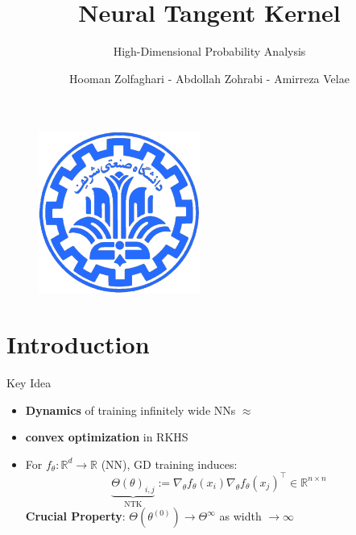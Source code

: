 \documentclass[serif, aspectratio=169]{beamer}
\author{Hooman Zolfaghari - Abdollah Zohrabi - Amirreza Velae}
\title{Neural Tangent Kernel}
\subtitle{High-Dimensional Probability Analysis}
\institute{
    Sharif University of Technology
}
\begin{document}
\begin{frame}
    \titlepage
    \vspace*{-0.6cm}
    \begin{figure}[htpb]
        \begin{center}
            \includegraphics[keepaspectratio, scale=0.25]{pic/sharif-main-logo.png}
        \end{center}
    \end{figure}
\end{frame}

\begin{frame}    
\tableofcontents[sectionstyle=show,
subsectionstyle=show/shaded/hide,
subsubsectionstyle=show/shaded/hide]
\end{frame}

\section{Introduction}

\begin{frame}{Key Idea}
	\begin{itemize}
		\item \textbf{Dynamics} of training infinitely wide NNs \(\approx\)
		\item \textbf{convex optimization} in RKHS
		
		\vspace{0.5em}
		\item For \(f_\theta: \mathbb{R}^d \to \mathbb{R}\) (NN), GD training induces:
		\[
		\underbrace{\Theta(\theta)_{i,j}}_{\text{NTK}} := \nabla_\theta f_\theta(x_i) \nabla_\theta f_\theta(x_j)^\top \in \mathbb{R}^{n \times n}
		\]
		\small
		\textbf{Crucial Property}: \(\Theta(\theta^{(0)}) \to \Theta^{\infty}\) as width \(\to \infty\)
		
	\end{itemize}
	
	
\end{frame}
\end{document}
